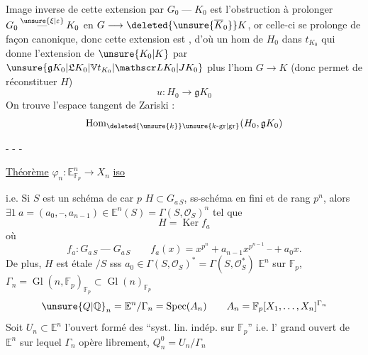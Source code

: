 Image inverse de cette extension par $G_0\mathbin{\text{---}}K_0$ est l'obstruction à prolonger $G_0\overset{\unsure{\xi|\varepsilon}}{\mathbin{\text{---}}}K_0$ en $G\longrightarrow\deleted{\unsure{\overline K_0}}K$, or celle-ci se prolonge de façon canonique,  donc cette extension
est , d'où un hom  de $H_0$ dans $t_{K_0}$ qui donne l'extension de $\unsure{K_0|K}$ par $\unsure{\mathfrak g K_0|\mathfrak L K_0|\mathbb V t_{K_0}|\mathscr L K_0|J K_0}$ plus l'hom $G\longrightarrow K$  (donc permet de réconstituer $H$)
\[ u:H_0\longrightarrow\mathfrak g K_0 \]
On trouve l'espace tangent de Zariski :
\[ \operatorname{Hom}_{\deleted{\unsure{k}}\unsure{k\text{-gr}|\text{gr}}}(H_0,\mathfrak g K_0) \]
\begin{center}- - -\end{center}

\uline{Théorème} $\varphi_n:\mathbb E^n_{\mathbb F_p}\longrightarrow X_n$ \uline{iso}

i.e. Si $S$ est un schéma de car $p$ $H\subset G_{a\,S}$, ss-schéma en  fini et   de rang $p^n$, alors $\exists1\ a=(a_0,\text{--},a_{n-1})\in\mathbb E^n(S)=\Gamma(S,\mathscr O_S)^n$ tel que
\[ H=\operatorname{Ker} f_a \]
où
\[ f_a:G_{a\,S}\mathbin{\text{---}}G_{a\,S}\qquad f_a(x)=x^{p^n}+a_{n-1}x^{p^{n-1}}\ \text{--}+a_0x . \]
De plus, $H$ est étale $/S$ sss $a_0\in\Gamma(S,\mathscr O_S)^*=\Gamma(S,\mathscr O_S^*)$
$\mathbb E^n$ sur $\mathbb F_p$, $\Gamma_n=\operatorname{Gl}(n,\mathbb F_p)_{\mathbb F_p}\subset\operatorname{Gl}(n)_{\mathbb F_p}$ 
\[ \unsure{Q|\mathbb Q}_n=\mathbb E^n/\Gamma_n=\operatorname{Spec}(A_n)\qquad A_n=\mathbb F_p[X_1,\ldots,X_n]^{\Gamma_n} \]
Soit $U_n\subset\mathbb E^n$ l'ouvert formé des ``syst. lin. indép. sur $\mathbb F_p$'' i.e. l'  grand ouvert de $\mathbb E^n$ sur lequel $\Gamma_n$ opère librement, $Q_n^0=U_n/\Gamma_n$

